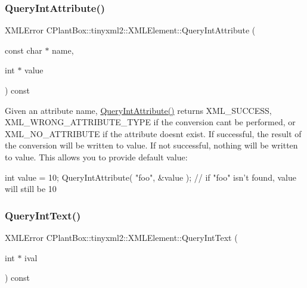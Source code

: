 \subsubsection{\texorpdfstring{Query\+Int\+Attribute()}{QueryIntAttribute()}}
{\footnotesize\ttfamily X\+M\+L\+Error C\+Plant\+Box\+::tinyxml2\+::\+X\+M\+L\+Element\+::\+Query\+Int\+Attribute (\begin{DoxyParamCaption}\item[{const char $\ast$}]{name,  }\item[{int $\ast$}]{value }\end{DoxyParamCaption}) const\hspace{0.3cm}{\ttfamily [inline]}}

Given an attribute name, \hyperlink{classCPlantBox_1_1tinyxml2_1_1XMLElement_adb0a6e52cb23f9226fa31af9eaebfd72}{Query\+Int\+Attribute()} returns X\+M\+L\+\_\+\+S\+U\+C\+C\+E\+SS, X\+M\+L\+\_\+\+W\+R\+O\+N\+G\+\_\+\+A\+T\+T\+R\+I\+B\+U\+T\+E\+\_\+\+T\+Y\+PE if the conversion can\textquotesingle{}t be performed, or X\+M\+L\+\_\+\+N\+O\+\_\+\+A\+T\+T\+R\+I\+B\+U\+TE if the attribute doesn\textquotesingle{}t exist. If successful, the result of the conversion will be written to \textquotesingle{}value\textquotesingle{}. If not successful, nothing will be written to \textquotesingle{}value\textquotesingle{}. This allows you to provide default value\+:

\begin{DoxyVerb}int value = 10;
QueryIntAttribute( "foo", &value );     // if "foo" isn't found, value will still be 10
\end{DoxyVerb}
 \mbox{\label{classCPlantBox_1_1tinyxml2_1_1XMLElement_a7e9b4ac7facb5bdca905036e2dbff523}} 
\subsubsection{\texorpdfstring{Query\+Int\+Text()}{QueryIntText()}}
{\footnotesize\ttfamily X\+M\+L\+Error C\+Plant\+Box\+::tinyxml2\+::\+X\+M\+L\+Element\+::\+Query\+Int\+Text (\begin{DoxyParamCaption}\item[{int $\ast$}]{ival }\end{DoxyParamCaption}) const}

